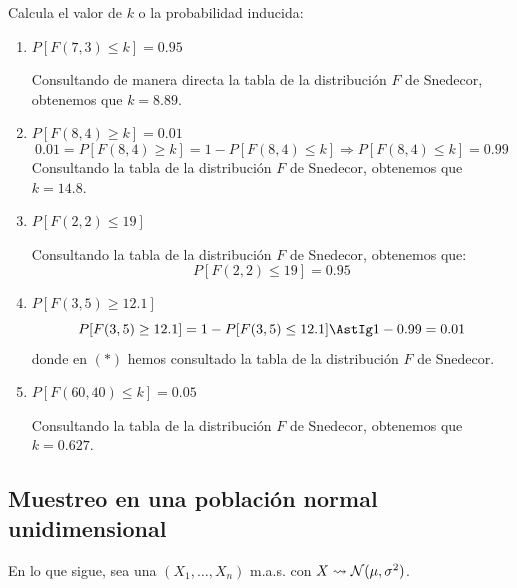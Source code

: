 \begin{ejercicio}
    Calcula el valor de $k$ o la probabilidad inducida:
    \begin{enumerate}[label=\alph*)]
        \item $P[F(7,3) \leq k] = 0.95$
        
            Consultando de manera directa la tabla de la distribución $F$ de Snedecor, obtenemos que $k = 8.89$.
        \item $P[F(8,4) \geq k] = 0.01$
            \begin{equation*}
                0.01 = P[F(8,4) \geq k] = 1 - P[F(8,4) \leq k] \Longrightarrow P[F(8,4) \leq k] = 0.99
            \end{equation*}
            Consultando la tabla de la distribución $F$ de Snedecor, obtenemos que $k = 14.8$.
        \item $P[F(2,2) \leq 19]$
        
            Consultando la tabla de la distribución $F$ de Snedecor, obtenemos que:
            \begin{equation*}
                P[F(2,2) \leq 19] = 0.95
            \end{equation*}
        \item $P[F(3,5) \geq 12.1]$
            \begin{equation*}
                P[F(3,5) \geq 12.1] = 1-P[F(3,5) \leq 12.1] \AstIg 1-0.99 = 0.01
            \end{equation*}
            donde en $(\ast)$ hemos consultado la tabla de la distribución $F$ de Snedecor.
        \item $P[F(60,40) \leq k] = 0.05$
            
            Consultando la tabla de la distribución $F$ de Snedecor, obtenemos que $k = 0.627$.
    \end{enumerate}
\end{ejercicio}

\subsection{Muestreo en una población normal unidimensional}
En lo que sigue, sea una $(X_1, \ldots, X_n)$ m.a.s. con $X\rightsquigarrow \mathcal{N}(\mu, \sigma^2)$.

